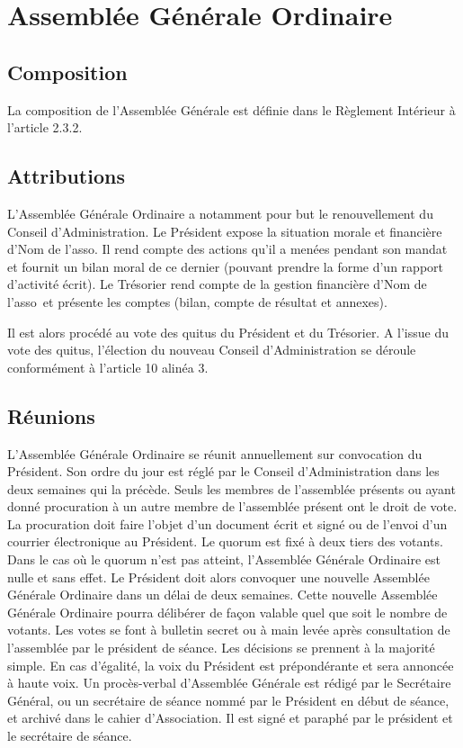 \documentclass[12pt]{article}
\newcommand{\asso}{Nom de l'asso}
\begin{document}
\section{Assemblée Générale Ordinaire}
\label{sec:ag}

\subsection{Composition}
\label{sec:ag:composition}

La composition de l’Assemblée Générale est définie dans le Règlement Intérieur à l’article 2.3.2.

\subsection{Attributions}
\label{sec:ag:attributions}

L’Assemblée Générale Ordinaire a notamment pour but le renouvellement du Conseil d’Administration.
Le Président expose la situation morale et financière d’\asso. Il rend compte des actions qu’il a menées
pendant son mandat et fournit un bilan moral de ce dernier (pouvant prendre la forme d’un rapport d’activité
écrit).
Le Trésorier rend compte de la gestion financière d’\asso~et présente les comptes (bilan, compte de
résultat et annexes).

Il est alors procédé au vote des quitus du Président et du Trésorier.
A l’issue du vote des quitus, l’élection du nouveau Conseil d’Administration se déroule conformément à
l’article 10 alinéa 3.

\subsection{Réunions}
\label{sec:ag:reunions}

L’Assemblée Générale Ordinaire se réunit annuellement sur convocation du Président.
Son ordre du jour est réglé par le Conseil d’Administration dans les deux semaines qui la précède.
Seuls les membres de l’assemblée présents ou ayant donné procuration à un autre membre de l’assemblée
présent ont le droit de vote. La procuration doit faire l’objet d’un document écrit et signé ou de l’envoi d’un
courrier électronique au Président.
Le quorum est fixé à deux tiers des votants. Dans le cas où le quorum n’est pas atteint, l’Assemblée Générale
Ordinaire est nulle et sans effet. Le Président doit alors convoquer une nouvelle Assemblée Générale
Ordinaire dans un délai de deux semaines. Cette nouvelle Assemblée Générale Ordinaire pourra délibérer de
façon valable quel que soit le nombre de votants.
Les votes se font à bulletin secret ou à main levée après consultation de l’assemblée par le président de
séance. Les décisions se prennent à la majorité simple. En cas d’égalité, la voix du Président est prépondérante
et sera annoncée à haute voix.
Un procès-verbal d’Assemblée Générale est rédigé par le Secrétaire Général, ou un secrétaire de séance
nommé par le Président en début de séance, et archivé dans le cahier d’Association. Il est signé et paraphé
par le président et le secrétaire de séance.
\end{document}
